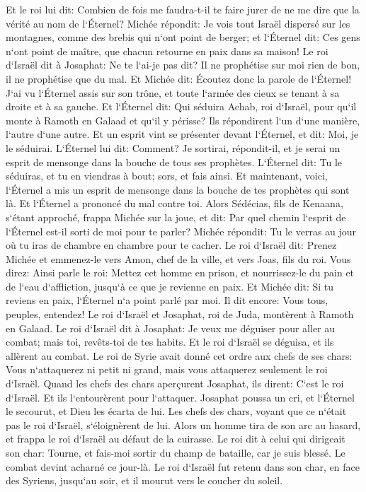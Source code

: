 \verse Et le roi lui dit: Combien de fois me faudra-t-il te faire jurer de ne me dire que la vérité au nom de l`Éternel? 
\verse Michée répondit: Je vois tout Israël dispersé sur les montagnes, comme des brebis qui n`ont point de berger; et l`Éternel dit: Ces gens n`ont point de maître, que chacun retourne en paix dans sa maison! 
\verse Le roi d`Israël dit à Josaphat: Ne te l`ai-je pas dit? Il ne prophétise sur moi rien de bon, il ne prophétise que du mal. 
\verse Et Michée dit: Écoutez donc la parole de l`Éternel! J`ai vu l`Éternel assis sur son trône, et toute l`armée des cieux se tenant à sa droite et à sa gauche. 
\verse Et l`Éternel dit: Qui séduira Achab, roi d`Israël, pour qu`il monte à Ramoth en Galaad et qu`il y périsse? Ils répondirent l`un d`une manière, l`autre d`une autre. 
\verse Et un esprit vint se présenter devant l`Éternel, et dit: Moi, je le séduirai. 
\verse L`Éternel lui dit: Comment? Je sortirai, répondit-il, et je serai un esprit de mensonge dans la bouche de tous ses prophètes. L`Éternel dit: Tu le séduiras, et tu en viendras à bout; sors, et fais ainsi. 
\verse Et maintenant, voici, l`Éternel a mis un esprit de mensonge dans la bouche de tes prophètes qui sont là. Et l`Éternel a prononcé du mal contre toi. 
\verse Alors Sédécias, fils de Kenaana, s`étant approché, frappa Michée sur la joue, et dit: Par quel chemin l`esprit de l`Éternel est-il sorti de moi pour te parler? 
\verse Michée répondit: Tu le verras au jour où tu iras de chambre en chambre pour te cacher. 
\verse Le roi d`Israël dit: Prenez Michée et emmenez-le vers Amon, chef de la ville, et vers Joas, fils du roi. 
\verse Vous direz: Ainsi parle le roi: Mettez cet homme en prison, et nourrissez-le du pain et de l`eau d`affliction, jusqu`à ce que je revienne en paix. 
\verse Et Michée dit: Si tu reviens en paix, l`Éternel n`a point parlé par moi. Il dit encore: Vous tous, peuples, entendez! 
\verse Le roi d`Israël et Josaphat, roi de Juda, montèrent à Ramoth en Galaad. 
\verse Le roi d`Israël dit à Josaphat: Je veux me déguiser pour aller au combat; mais toi, revêts-toi de tes habits. Et le roi d`Israël se déguisa, et ils allèrent au combat. 
\verse Le roi de Syrie avait donné cet ordre aux chefs de ses chars: Vous n`attaquerez ni petit ni grand, mais vous attaquerez seulement le roi d`Israël. 
\verse Quand les chefs des chars aperçurent Josaphat, ils dirent: C`est le roi d`Israël. Et ils l`entourèrent pour l`attaquer. Josaphat poussa un cri, et l`Éternel le secourut, et Dieu les écarta de lui. 
\verse Les chefs des chars, voyant que ce n`était pas le roi d`Israël, s`éloignèrent de lui. 
\verse Alors un homme tira de son arc au hasard, et frappa le roi d`Israël au défaut de la cuirasse. Le roi dit à celui qui dirigeait son char: Tourne, et fais-moi sortir du champ de bataille, car je suis blessé. 
\verse Le combat devint acharné ce jour-là. Le roi d`Israël fut retenu dans son char, en face des Syriens, jusqu`au soir, et il mourut vers le coucher du soleil. 

